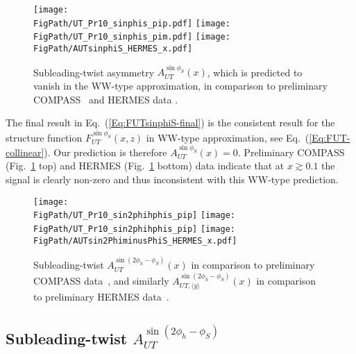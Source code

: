 \documentclass[a4paper,11pt]{article}
\newcommand*{\FigPath}{./figs}%
\begin{document}
\begin{figure}[h!]
\centering
\texttt{[image: \\FigPath/UT\_Pr10\_sinphis\_pip.pdf]}
\texttt{[image: \\FigPath/UT\_Pr10\_sinphis\_pim.pdf]}
\texttt{[image: \\FigPath/AUTsinphiS\_HERMES\_x.pdf]}
\caption{\label{autsinphis} 
 	Subleading-twist asymmetry $A_{UT}^{\sin\phi_S}(x)$, which 
	is predicted to vanish in the WW-type approximation, in 
	comparison to preliminary COMPASS~\cite{Parsamyan:2013fia} and HERMES data \cite{Schnell:2010zza}.}
\end{figure}

The final result in Eq.~(\ref{Eq:FUTsinphiS-final}) is the consistent 
result for the structure function $F_{UT}^{\sin\phi_S}(x,z)$ in WW-type 
approximation, see Eq.~(\ref{Eq:FUT-collinear}). Our prediction is 
therefore $A_{UT}^{\sin\phi_S}(x)=0$. 
Preliminary COMPASS \cite{Parsamyan:2013fia}
 (Fig.~\ref{autsinphis} top) and 
HERMES \cite{Schnell:2010zza} (Fig.~\ref{autsinphis} bottom) data 
indicate that at $x\gtrsim 0.1$ the signal is clearly non-zero and 
thus inconsistent with this WW-type prediction. 



\begin{figure}[t]
\centering
\texttt{[image: \\FigPath/UT\_Pr10\_sin2phihphis\_pip]}
\texttt{[image: \\FigPath/UT\_Pr10\_sin2phihphis\_pip]}
\texttt{[image: \\FigPath/AUTsin2PhiminusPhiS\_HERMES\_x.pdf]}
\caption{\label{autsin2phihphis} 
	Subleading-twist $A_{UT}^{\sin(2 \phi_h - \phi_S)}(x)$  in comparison to preliminary COMPASS data~\cite{Parsamyan:2013fia}, and 	
	similarly $A_{UT, \langle y \rangle}^{\sin(2\phi_h-\phi_S)}(x)$ in comparison to  
	preliminary HERMES data~\cite{Schnell:2010zza}.
	}
\end{figure}


\subsection{\boldmath Subleading-twist  $A_{UT}^{\sin(2\phi_h-\phi_S)}$ }
\label{Sec-7.8:FUTsin2phi-phiS}
\end{document}
